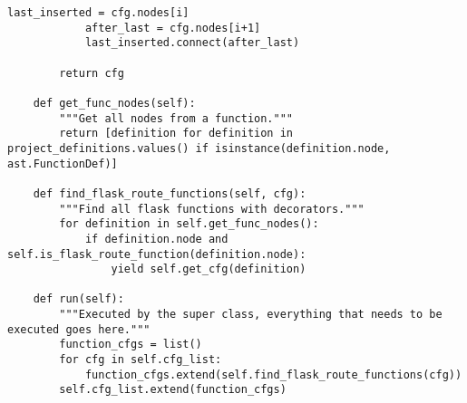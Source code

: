 \begin{lstlisting}[style=python, caption={Implementation of the Flask adaptor}, label={flask_adaptor_implementation}]
            last_inserted = cfg.nodes[i]
            after_last = cfg.nodes[i+1]
            last_inserted.connect(after_last)            

        return cfg

    def get_func_nodes(self):
        """Get all nodes from a function."""
        return [definition for definition in project_definitions.values() if isinstance(definition.node, ast.FunctionDef)]

    def find_flask_route_functions(self, cfg):
        """Find all flask functions with decorators."""
        for definition in self.get_func_nodes():
            if definition.node and self.is_flask_route_function(definition.node):
                yield self.get_cfg(definition)

    def run(self):
        """Executed by the super class, everything that needs to be executed goes here."""
        function_cfgs = list()
        for cfg in self.cfg_list:
            function_cfgs.extend(self.find_flask_route_functions(cfg))
        self.cfg_list.extend(function_cfgs)
\end{lstlisting}

